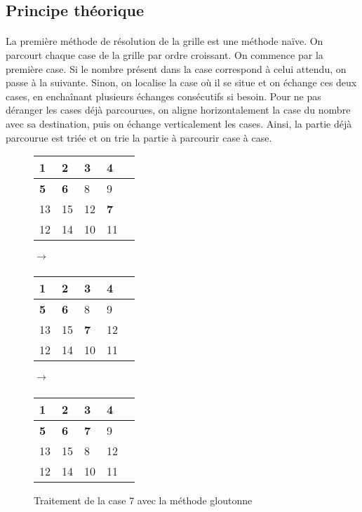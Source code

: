 \documentclass[12pt]{article}
\begin{document}
\subsection{Principe théorique}
\paragraph{}
La première méthode de résolution de la grille est une méthode naïve. On parcourt chaque case de la grille par ordre croissant. On commence par la première case. Si le nombre présent dans la case correspond à celui attendu, on passe à la suivante. Sinon, on localise la case où il se situe et on échange ces deux cases, en enchaînant plusieurs échanges consécutifs si besoin. Pour ne pas déranger les cases déjà parcourues, on aligne horizontalement la case du nombre avec sa destination, puis on échange verticalement les cases. Ainsi, la partie déjà parcourue est triée et on trie la partie à parcourir case à case.

\hspace{1cm}
\begin{figure}[h]
    \centering
    \begin{tabular}{ | l | l | l | l | l | }
        \hline
        \textbf{1}  & \textbf{2}  & \textbf{3}  & \textbf{4} \\
        \hline
        \textbf{5}  & \textbf{6}  & 8  & 9  \\
        \hline
        13  & 15  & 12  & \textbf{7} \\
        \hline
         12  & 14  & 10 & 11 \\
        \hline
    \end{tabular}
    $\xrightarrow[]{}$
    \begin{tabular}{ | l | l | l | l | l | }
        \hline
        \textbf{1}  & \textbf{2}  & \textbf{3}  & \textbf{4} \\
        \hline
        \textbf{5}  & \textbf{6}  & 8  & 9  \\
        \hline
        13  & 15  & \textbf{7} & 12 \\
        \hline
        12  & 14  & 10 & 11 \\
        \hline
    \end{tabular}
    $\xrightarrow[]{}$
    \begin{tabular}{ | l | l | l | l | l | }
        \hline
        \textbf{1}  & \textbf{2}  & \textbf{3}  & \textbf{4} \\
        \hline
        \textbf{5}  & \textbf{6}  & \textbf{7}  & 9 \\
        \hline
        13  & 15  & 8  & 12 \\
        \hline
        12  & 14  & 10 & 11 \\
        \hline
    \end{tabular}
    \caption{Traitement de la case 7 avec la méthode gloutonne}
    \label{fig:enter-label}
\end{figure}
\end{document}
